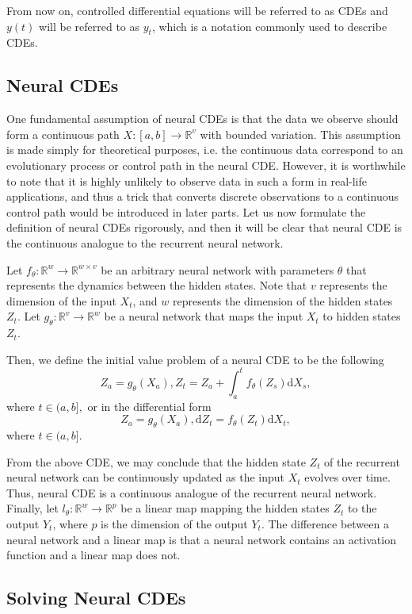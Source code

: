 \documentclass[a4paper,11pt,titlepage]{article}
\theoremstyle{definition}
\theoremstyle{plain}
\theoremstyle{remark}
\begin{document}
From now on, controlled differential equations will be referred to as CDEs and $y(t)$ will be referred to as $y_t$, which is a notation commonly used to describe CDEs.

\subsection{Neural CDEs}

One fundamental assumption of neural CDEs is that the data we observe should form a continuous path $X:[a,b]\rightarrow\mathbb{R}^v$ with bounded variation. This assumption is made simply for theoretical purposes, i.e. the continuous data correspond to an evolutionary process or control path in the neural CDE. However, it is worthwhile to note that it is highly unlikely to observe data in such a form in real-life applications, and thus a trick that converts discrete observations to a continuous control path would be introduced in later parts. Let us now formulate the definition of neural CDEs rigorously, and then it will be clear that neural CDE is the continuous analogue to the recurrent neural network.

Let $f_\theta:\mathbb{R}^w\rightarrow\mathbb{R}^{w\times v}$ be an arbitrary neural network with parameters $\theta$ that represents the dynamics between the hidden states. Note that $v$ represents the dimension of the input $X_t$, and $w$ represents the dimension of the hidden states $Z_t$. Let $g_\theta:\mathbb{R}^v\rightarrow\mathbb{R}^w$ be a neural network that maps the input $X_t$ to hidden states $Z_t$.

Then, we define the initial value problem of a neural CDE to be the following
$$Z_a=g_\theta(X_a), Z_t=Z_a+\int_a^tf_\theta(Z_s)\mathrm{d}X_s,$$ where $t\in(a,b],$
or in the differential form
$$Z_a=g_\theta(X_a), \mathrm{d}Z_t=f_\theta(Z_t)\mathrm{d}X_t,$$ where $t\in(a,b].$

From the above CDE, we may conclude that the hidden state $Z_t$ of the recurrent neural network can be continuously updated as the input $X_t$ evolves over time. Thus, neural CDE is a continuous analogue of the recurrent neural network. Finally, let $l_\theta:\mathbb{R}^w\rightarrow\mathbb{R}^p$ be a linear map mapping the hidden states $Z_t$ to the output $Y_t$, where $p$ is the dimension of the output $Y_t$. The difference between a neural network and a linear map is that a neural network contains an activation function and a linear map does not.

\subsection{Solving Neural CDEs}
\end{document}
